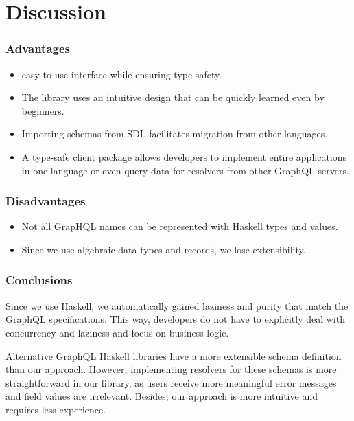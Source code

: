 \section{Discussion}

    
\begin{frame}\frametitle{Advantages}

\begin{itemize}
    \item easy-to-use interface while ensuring type safety.
    \item The library uses an intuitive design that can be quickly learned even by beginners.
    \item Importing schemas from SDL facilitates migration from other languages.
    \item A type-safe client package allows developers to implement entire applications in one language or even query data for resolvers from other GraphQL servers.
\end{itemize}

\end{frame}

\begin{frame}\frametitle{Disadvantages}

\begin{itemize}
    \item Not all GrapHQL names can be represented with Haskell types and values.
    \item Since we use algebraic data types and records, we lose extensibility.
\end{itemize}

\end{frame}

\begin{frame}\frametitle{Conclusions}
    
    Since we use Haskell, we automatically gained laziness and purity that match the GraphQL specifications. This way, developers do not have to explicitly deal with concurrency and laziness and focus on business logic. 

    Alternative GraphQL Haskell libraries have a more extensible schema definition than our approach. However, implementing resolvers for these schemas is more straightforward in our library, as users receive more meaningful error messages and field values are irrelevant. Besides, our approach is more intuitive and requires less experience.
    
\end{frame}

